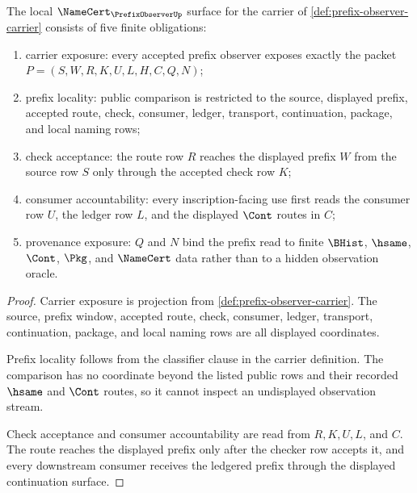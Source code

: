 \begin{theorem}
\label{thm:prefix-observer-namecert-obligations}
The local $\NameCert_{\PrefixObserverUp}$ surface for the carrier of
\autoref{def:prefix-observer-carrier} consists of five finite obligations:
\begin{enumerate}
\item carrier exposure: every accepted prefix observer exposes exactly the packet $P=(S,W,R,K,U,L,H,C,Q,N)$;
\item prefix locality: public comparison is restricted to the source, displayed prefix, accepted route, check, consumer, ledger, transport, continuation, package, and local naming rows;
\item check acceptance: the route row $R$ reaches the displayed prefix $W$ from the source row $S$ only through the accepted check row $K$;
\item consumer accountability: every inscription-facing use first reads the consumer row $U$, the ledger row $L$, and the displayed $\Cont$ routes in $C$;
\item provenance exposure: $Q$ and $N$ bind the prefix read to finite $\BHist$, $\hsame$, $\Cont$, $\Pkg$, and $\NameCert$ data rather than to a hidden observation oracle.
\end{enumerate}
\end{theorem}
\begin{proof}
Carrier exposure is projection from \autoref{def:prefix-observer-carrier}. The
source, prefix window, accepted route, check, consumer, ledger, transport,
continuation, package, and local naming rows are all displayed coordinates.

Prefix locality follows from the classifier clause in the carrier definition.
The comparison has no coordinate beyond the listed public rows and their
recorded $\hsame$ and $\Cont$ routes, so it cannot inspect an undisplayed
observation stream.

Check acceptance and consumer accountability are read from $R,K,U,L$, and
$C$. The route reaches the displayed prefix only after the checker row accepts
it, and every downstream consumer receives the ledgered prefix through the
displayed continuation surface.
\end{proof}

